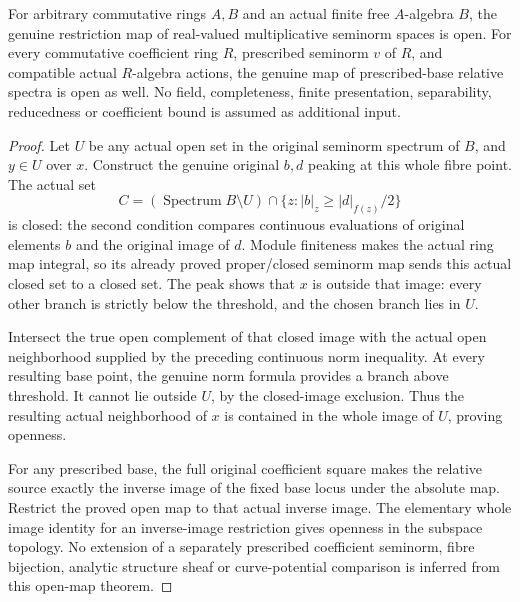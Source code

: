 \begin{theorem}
\label{spectrum:actual-finite-free-open-map}
For arbitrary commutative rings $A,B$ and an actual finite free
$A$-algebra $B$, the genuine restriction map of real-valued
multiplicative seminorm spaces is open. For every commutative
coefficient ring $R$, prescribed seminorm $v$ of $R$, and compatible
actual $R$-algebra actions, the genuine map of prescribed-base
relative spectra is open as well. No field, completeness, finite
presentation, separability, reducedness or coefficient bound is
assumed as additional input.
\leanok
\end{theorem}
\begin{proof}
Let $U$ be any actual open set in the original seminorm spectrum of
$B$, and $y\in U$ over $x$. Construct the genuine original $b,d$
peaking at this whole fibre point. The actual set
\[
 C=(\operatorname{Spectrum}B\setminus U)
   \cap\{z:|b|_z\ge |d|_{f(z)}/2\}
\]
is closed: the second condition compares continuous evaluations of
original elements $b$ and the original image of $d$. Module
finiteness makes the actual ring map integral, so its already proved
proper/closed seminorm map sends this actual closed set to a closed
set. The peak shows that $x$ is outside that image: every other
branch is strictly below the threshold, and the chosen branch lies
in $U$.

Intersect the true open complement of that closed image with the
actual open neighborhood supplied by the preceding continuous norm
inequality. At every resulting base point, the genuine norm formula
provides a branch above threshold. It cannot lie outside $U$, by the
closed-image exclusion. Thus the resulting actual neighborhood of
$x$ is contained in the whole image of $U$, proving openness.

For any prescribed base, the full original coefficient square makes
the relative source exactly the inverse image of the fixed base
locus under the absolute map. Restrict the proved open map to that
actual inverse image. The elementary whole image identity for an
inverse-image restriction gives openness in the subspace topology.
No extension of a separately prescribed coefficient seminorm, fibre
bijection, analytic structure sheaf or curve-potential comparison is
inferred from this open-map theorem.
\end{proof}
